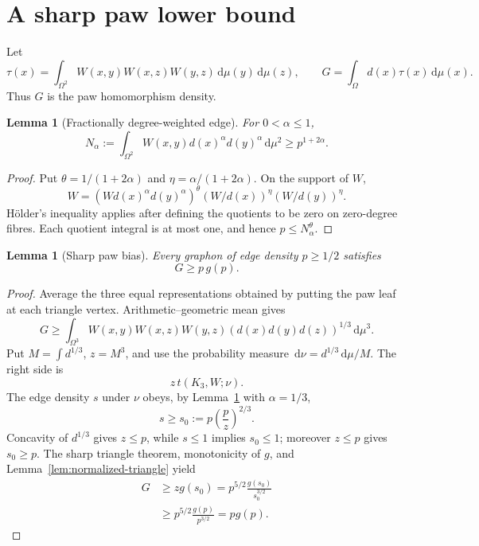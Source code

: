 \documentclass[11pt]{article}
\newtheorem{lemma}[theorem]{Lemma}
\newcommand{\dd}{\,\mathrm d}
\begin{document}
\section{A sharp paw lower bound}

Let
\[
 \tau(x)=\int_{\Omega^2}
 W(x,y)W(x,z)W(y,z)\dd\mu(y)\dd\mu(z),
 \qquad G=\int_\Omega d(x)\tau(x)\dd\mu(x).
\]
Thus $G$ is the paw homomorphism density.

\begin{lemma}[Fractionally degree-weighted edge]
\label{lem:fractional-edge}
For $0<\alpha\leq1$,
\[
 N_\alpha:=\int_{\Omega^2}W(x,y)d(x)^\alpha d(y)^\alpha\dd\mu^2
 \geq p^{1+2\alpha}.
\]
\end{lemma}

\begin{proof}
Put $\theta=1/(1+2\alpha)$ and
$\eta=\alpha/(1+2\alpha)$.  On the support of $W$,
\[
 W=(Wd(x)^\alpha d(y)^\alpha)^\theta
    (W/d(x))^\eta(W/d(y))^\eta.
\]
H\"older's inequality applies after defining the quotients to be zero on
zero-degree fibres.  Each quotient integral is at most one, and hence
$p\leq N_\alpha^\theta$.
\end{proof}

\begin{lemma}[Sharp paw bias]
\label{lem:sharp-paw}
Every graphon of edge density $p\geq1/2$ satisfies
\begin{equation}
 G\geq p\,g(p).
 \label{eq:sharp-paw}
\end{equation}
\end{lemma}

\begin{proof}
Average the three equal representations obtained by putting the paw leaf at
each triangle vertex.  Arithmetic--geometric mean gives
\[
 G\geq
 \int_{\Omega^3}W(x,y)W(x,z)W(y,z)
       (d(x)d(y)d(z))^{1/3}\dd\mu^3.
\]
Put $M=\int d^{1/3}$, $z=M^3$, and use the probability measure
$\dd\nu=d^{1/3}\dd\mu/M$.  The right side is
\[
 z\,t(K_3,W;\nu).
\]
The edge density $s$ under $\nu$ obeys, by
Lemma~\ref{lem:fractional-edge} with $\alpha=1/3$,
\[
 s\geq s_0:=p\left(\frac pz\right)^{2/3}.
\]
Concavity of $d^{1/3}$ gives $z\leq p$, while $s\leq1$ implies
$s_0\leq1$; moreover $z\leq p$ gives $s_0\geq p$.  The sharp triangle
theorem, monotonicity of $g$, and
Lemma~\ref{lem:normalized-triangle} yield
\begin{align*}
 G&\geq z g(s_0)
 =p^{5/2}\frac{g(s_0)}{s_0^{3/2}}\\
 &\geq p^{5/2}\frac{g(p)}{p^{3/2}}
 =p g(p).
\end{align*}
\end{proof}
\end{document}
